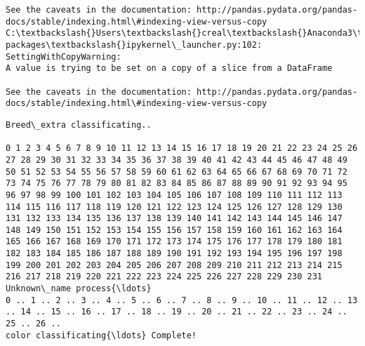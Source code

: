 \documentclass[11pt]{article}
\begin{document}
\begin{Verbatim}[commandchars=\\\{\}]
See the caveats in the documentation: http://pandas.pydata.org/pandas-docs/stable/indexing.html\#indexing-view-versus-copy
C:\textbackslash{}Users\textbackslash{}creal\textbackslash{}Anaconda3\textbackslash{}lib\textbackslash{}site-packages\textbackslash{}ipykernel\_launcher.py:102: SettingWithCopyWarning: 
A value is trying to be set on a copy of a slice from a DataFrame

See the caveats in the documentation: http://pandas.pydata.org/pandas-docs/stable/indexing.html\#indexing-view-versus-copy

    \end{Verbatim}

    \begin{Verbatim}[commandchars=\\\{\}]
Breed\_extra classificating..

0 1 2 3 4 5 6 7 8 9 10 11 12 13 14 15 16 17 18 19 20 21 22 23 24 25 26 27 28 29 30 31 32 33 34 35 36 37 38 39 40 41 42 43 44 45 46 47 48 49 50 51 52 53 54 55 56 57 58 59 60 61 62 63 64 65 66 67 68 69 70 71 72 73 74 75 76 77 78 79 80 81 82 83 84 85 86 87 88 89 90 91 92 93 94 95 96 97 98 99 100 101 102 103 104 105 106 107 108 109 110 111 112 113 114 115 116 117 118 119 120 121 122 123 124 125 126 127 128 129 130 131 132 133 134 135 136 137 138 139 140 141 142 143 144 145 146 147 148 149 150 151 152 153 154 155 156 157 158 159 160 161 162 163 164 165 166 167 168 169 170 171 172 173 174 175 176 177 178 179 180 181 182 183 184 185 186 187 188 189 190 191 192 193 194 195 196 197 198 199 200 201 202 203 204 205 206 207 208 209 210 211 212 213 214 215 216 217 218 219 220 221 222 223 224 225 226 227 228 229 230 231 
Unknown\_name process{\ldots}
0 .. 1 .. 2 .. 3 .. 4 .. 5 .. 6 .. 7 .. 8 .. 9 .. 10 .. 11 .. 12 .. 13 .. 14 .. 15 .. 16 .. 17 .. 18 .. 19 .. 20 .. 21 .. 22 .. 23 .. 24 .. 25 .. 26 .. 
color classificating{\ldots} Complete!

    \end{Verbatim}
\end{document}
